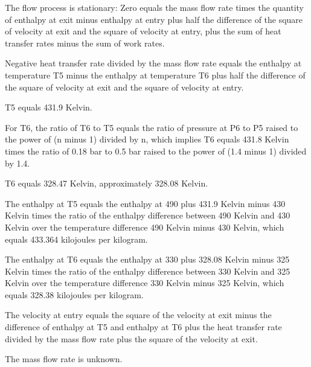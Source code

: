 The flow process is stationary:
Zero equals the mass flow rate times the quantity of enthalpy at exit minus enthalpy at entry plus half the difference of the square of velocity at exit and the square of velocity at entry, plus the sum of heat transfer rates minus the sum of work rates.

Negative heat transfer rate divided by the mass flow rate equals the enthalpy at temperature T5 minus the enthalpy at temperature T6 plus half the difference of the square of velocity at exit and the square of velocity at entry.

T5 equals 431.9 Kelvin.

For T6, the ratio of T6 to T5 equals the ratio of pressure at P6 to P5 raised to the power of (n minus 1) divided by n, which implies T6 equals 431.8 Kelvin times the ratio of 0.18 bar to 0.5 bar raised to the power of (1.4 minus 1) divided by 1.4.

T6 equals 328.47 Kelvin, approximately 328.08 Kelvin.

The enthalpy at T5 equals the enthalpy at 490 plus 431.9 Kelvin minus 430 Kelvin times the ratio of the enthalpy difference between 490 Kelvin and 430 Kelvin over the temperature difference 490 Kelvin minus 430 Kelvin, which equals 433.364 kilojoules per kilogram.

The enthalpy at T6 equals the enthalpy at 330 plus 328.08 Kelvin minus 325 Kelvin times the ratio of the enthalpy difference between 330 Kelvin and 325 Kelvin over the temperature difference 330 Kelvin minus 325 Kelvin, which equals 328.38 kilojoules per kilogram.

The velocity at entry equals the square of the velocity at exit minus the difference of enthalpy at T5 and enthalpy at T6 plus the heat transfer rate divided by the mass flow rate plus the square of the velocity at exit.

The mass flow rate is unknown.